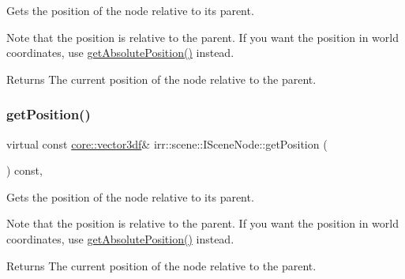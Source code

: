 Gets the position of the node relative to its parent. 

Note that the position is relative to the parent. If you want the position in world coordinates, use \hyperlink{classirr_1_1scene_1_1ISceneNode_a09a1c2ce3cf5448197a0c7b0bb16a516}{get\+Absolute\+Position()} instead. \begin{DoxyReturn}{Returns}
The current position of the node relative to the parent. 
\end{DoxyReturn}
\mbox{\label{classirr_1_1scene_1_1ISceneNode_af5686d35e868e7d295c2d2cb84799d20}} 
\subsubsection{\texorpdfstring{get\+Position()}{getPosition()}\hspace{0.1cm}{\footnotesize\ttfamily [2/2]}}
{\footnotesize\ttfamily virtual const \hyperlink{namespaceirr_1_1core_ae6e2b2a6c552833ebbd5b7463d03586b}{core\+::vector3df}\& irr\+::scene\+::\+I\+Scene\+Node\+::get\+Position (\begin{DoxyParamCaption}{ }\end{DoxyParamCaption}) const\hspace{0.3cm}{\ttfamily [inline]}, {\ttfamily [virtual]}}



Gets the position of the node relative to its parent. 

Note that the position is relative to the parent. If you want the position in world coordinates, use \hyperlink{classirr_1_1scene_1_1ISceneNode_a09a1c2ce3cf5448197a0c7b0bb16a516}{get\+Absolute\+Position()} instead. \begin{DoxyReturn}{Returns}
The current position of the node relative to the parent. 
\end{DoxyReturn}
\mbox{\label{classirr_1_1scene_1_1ISceneNode_ac7c47ec49174315af83cf5f5d24edb24}} 

